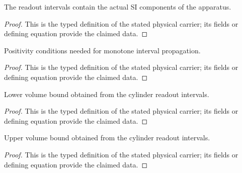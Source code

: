 \begin{definition}
  \label{def:physics:IPhO_2026_4_A_1:aux024}
  The readout intervals contain the actual SI components of the apparatus.
\end{definition}
\begin{proof}
  This is the typed definition of the stated physical carrier; its fields or defining equation provide the claimed data.
\end{proof}

\begin{definition}
  \label{def:physics:IPhO_2026_4_A_1:aux025}
  Positivity conditions needed for monotone interval propagation.
\end{definition}
\begin{proof}
  This is the typed definition of the stated physical carrier; its fields or defining equation provide the claimed data.
\end{proof}

\begin{definition}
  \label{def:physics:IPhO_2026_4_A_1:aux026}
  Lower volume bound obtained from the cylinder readout intervals.
\end{definition}
\begin{proof}
  This is the typed definition of the stated physical carrier; its fields or defining equation provide the claimed data.
\end{proof}

\begin{definition}
  \label{def:physics:IPhO_2026_4_A_1:aux027}
  Upper volume bound obtained from the cylinder readout intervals.
\end{definition}
\begin{proof}
  This is the typed definition of the stated physical carrier; its fields or defining equation provide the claimed data.
\end{proof}

